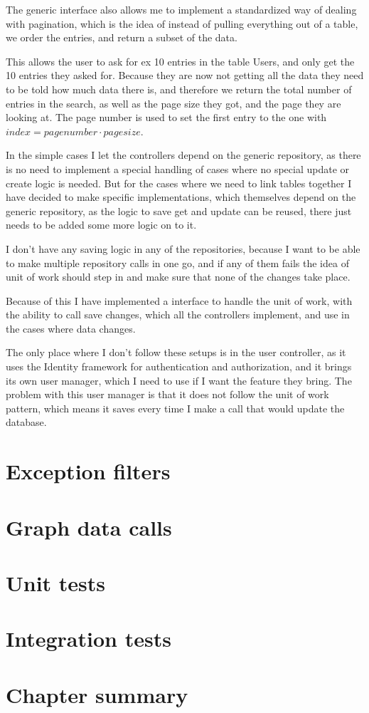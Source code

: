 The generic interface also allows me to implement a standardized way of dealing
with pagination, which is the idea of instead of pulling everything out of a
table, we order the entries, and return a subset of the data. 

This allows the user to ask for ex 10 entries in the table Users, and only get
the 10 entries they asked for. Because they are now not getting all the data
they need to be told how much data there is, and therefore we return the total
number of entries in the search, as well as the page size they got, and the page
they are looking at. The page number is used to set the first entry to the one
with $index = page number \cdot page size$. 

In the simple cases I let the controllers depend on the generic repository, as
there is no need to implement a special handling of cases where no special
update or create logic is needed. But for the cases where we need to link tables
together I have decided to make specific implementations, which themselves
depend on the generic repository, as the logic to save get and update can be
reused, there just needs to be added some more logic on to it. 

I don't have any saving logic in any of the repositories, because I want to be
able to make multiple repository calls in one go, and if any of them fails the
idea of unit of work should step in and make sure that none of the changes take
place. 

Because of this I have implemented a interface to handle the unit of work, with
the ability to call save changes, which all the controllers implement, and use
in the cases where data changes. 

The only place where I don't follow these setups is in the user controller, as
it uses the Identity framework for authentication and authorization, and it
brings its own user manager, which I need to use if I want the feature they
bring. The problem with this user manager is that it does not follow the unit of
work pattern, which means it saves every time I make a call that would update
the database. 

\section{Exception filters}
\label{sec:Exception filters}


\section{Graph data calls}
\label{sec:Graph data calls}

\section{Unit tests}
\label{sec:unit_tests}

\section{Integration tests}
\label{sec:integration_tests}

\section{Chapter summary}
